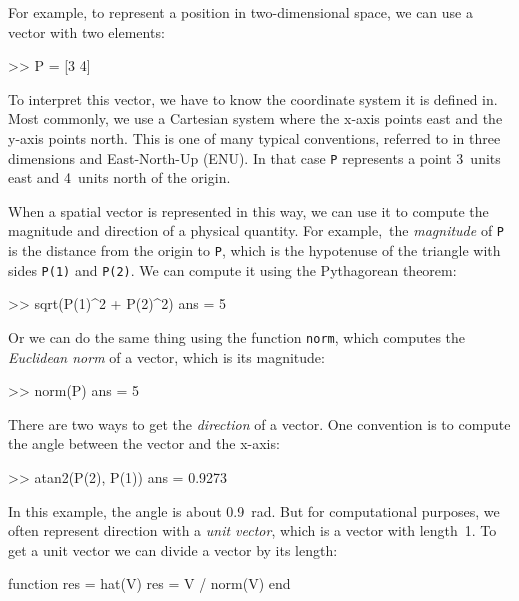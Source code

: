 
For example, to represent a position in two-dimensional space, we can use a vector with two elements:

\begin{code}
>> P = [3 4]
\end{code}

To interpret this vector, we have to know the coordinate system it is defined in.  Most commonly, we use a Cartesian system where the x-axis points east and the y-axis points north.  This is one of many typical conventions, referred to in three dimensions and East-North-Up (ENU). In that case \lstinline{P} represents a point 3~units east and 4~units north of the origin.


When a spatial vector is represented in this way, we can use it to compute the magnitude and direction of a physical quantity.
For example,~the \emph{magnitude} of \lstinline{P} is the distance from the origin to \lstinline{P}, which is the hypotenuse of the triangle with sides \lstinline{P(1)} and \lstinline{P(2)}.
We can compute it using the Pytha\-gorean theorem:

\begin{code}
>> sqrt(P(1)^2 + P(2)^2)
ans = 5
\end{code}

Or we can do the same thing using the function \lstinline{norm}, which computes the
\emph{Euclidean norm} of a vector, which is its magnitude:


\begin{code}
>> norm(P)
ans = 5
\end{code}

There are two ways to get the \emph{direction} of a vector.  One convention is to compute the angle between the vector and the x-axis:

\begin{code}
>> atan2(P(2), P(1))
ans = 0.9273
\end{code}

In this example, the angle is about \SI{0.9}{\radian}.  But for computational purposes, we often represent direction with a \emph{unit vector}, which is a vector with length~1.  To get a unit vector we can divide a vector by its length:

\begin{code}
function res = hat(V)
    res = V / norm(V)
end
\end{code}

